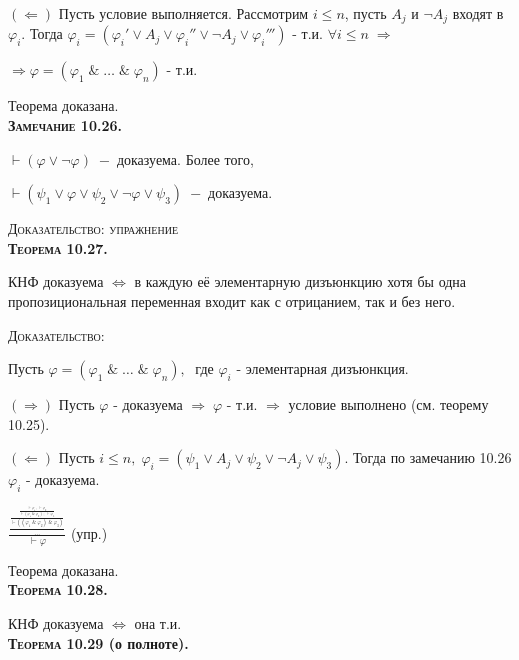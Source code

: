 \documentclass[18pt, a4paper]{extarticle}
\newcommand{\ampersand}{\;\&\;}
\begin{document}
$\boxed{(\Leftarrow)}$ Пусть условие выполняется. Рассмотрим $i\leqslant n$, пусть $A_j$ и $\lnot A_j$ входят в $\varphi_i$. Тогда $\varphi_i=(\varphi_i'\vee A_j\vee \varphi_i'' \vee \lnot A_j\vee \varphi_i''')$ -  т.и. $\forall i\leqslant n\;\Rightarrow\;$

$\Rightarrow\varphi=(\varphi_1\ampersand\dots\ampersand\varphi_n)$ -  т.и.

Теорема доказана.\\

\textbf{\textsc{Замечание 10.26.}} 

$\vdash(\varphi\vee\lnot\varphi)\;-\;$доказуема. Более того,

$\vdash(\psi_1\vee\varphi\vee\psi_2\vee\lnot\varphi\vee\psi_3)\;-\;$доказуема.

\textsc{Доказательство: упражнение}\\

\textbf{\textsc{Теорема 10.27.}} 

КНФ доказуема $\Leftrightarrow$ в каждую её элементарную дизъюнкцию хотя бы одна пропозициональная переменная входит как с отрицанием, так и без него.

\textsc{Доказательство:} 

Пусть $\varphi=(\varphi_1\ampersand\dots\ampersand\varphi_n),\;$ где $\varphi_i$ -  элементарная дизъюнкция.

$\boxed{(\Rightarrow)}$ Пусть $\varphi$ -  доказуема $\Rightarrow\;\varphi$ -  т.и. $\Rightarrow$ условие выполнено (см. теорему 10.25).

$\boxed{(\Leftarrow)}$ Пусть $i\leqslant n,\;\varphi_i=(\psi_1\vee A_j\vee\psi_2\vee\lnot A_j\vee\psi_3)$. Тогда по замечанию 10.26\;\; $\varphi_i$ -  доказуема.
\vspace{-1mm}
\begin{center}
$\displaystyle \frac{\displaystyle \frac{\displaystyle \frac{\displaystyle \frac{\vdash\varphi_1,\;\vdash\varphi_2}{\vdash(\varphi_1\ampersand\varphi_2)\;;\;\vdash\varphi_3}}{\vdash((\varphi_1\ampersand\varphi_2)\ampersand\varphi_3)}}{\dots}}{\vdash\varphi}$ (упр.)
\end{center}

Теорема доказана.\\

\textbf{\textsc{Теорема 10.28.}} 

КНФ доказуема $\Leftrightarrow$ она т.и.\\

\textbf{\textsc{Теорема 10.29 }(о полноте).} 
\end{document}
